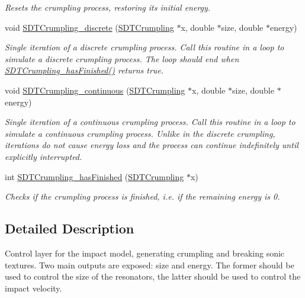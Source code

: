 \begin{DoxyCompactItemize}
\begin{DoxyCompactList}\small\item\em Resets the crumpling process, restoring its initial energy. \end{DoxyCompactList}\item 
void \hyperlink{group__crumpling_ga7b5488ac7dcb7a58f67dfb38bd89315a}{S\+D\+T\+Crumpling\+\_\+discrete} (\hyperlink{group__crumpling_ga1d5c6cf3fe003cd4d993dcfe0a39f72e}{S\+D\+T\+Crumpling} $\ast$x, double $\ast$size, double $\ast$energy)
\begin{DoxyCompactList}\small\item\em Single iteration of a discrete crumpling process. Call this routine in a loop to simulate a discrete crumpling process. The loop should end when \hyperlink{group__crumpling_ga7d5c2d51daf736d9821d4904ee1f4d74}{S\+D\+T\+Crumpling\+\_\+has\+Finished()} returns true. \end{DoxyCompactList}\item 
void \hyperlink{group__crumpling_ga8577606d934a6c80db0833a35a17021b}{S\+D\+T\+Crumpling\+\_\+continuous} (\hyperlink{group__crumpling_ga1d5c6cf3fe003cd4d993dcfe0a39f72e}{S\+D\+T\+Crumpling} $\ast$x, double $\ast$size, double $\ast$energy)
\begin{DoxyCompactList}\small\item\em Single iteration of a continuous crumpling process. Call this routine in a loop to simulate a continuous crumpling process. Unlike in the discrete crumpling, iterations do not cause energy loss and the process can continue indefinitely until explicitly interrupted. \end{DoxyCompactList}\item 
int \hyperlink{group__crumpling_ga7d5c2d51daf736d9821d4904ee1f4d74}{S\+D\+T\+Crumpling\+\_\+has\+Finished} (\hyperlink{group__crumpling_ga1d5c6cf3fe003cd4d993dcfe0a39f72e}{S\+D\+T\+Crumpling} $\ast$x)
\begin{DoxyCompactList}\small\item\em Checks if the crumpling process is finished, i.\+e. if the remaining energy is 0. \end{DoxyCompactList}\end{DoxyCompactItemize}


\subsection{Detailed Description}
Control layer for the impact model, generating crumpling and breaking sonic textures. Two main outputs are exposed\+: size and energy. The former should be used to control the size of the resonators, the latter should be used to control the impact velocity. 

